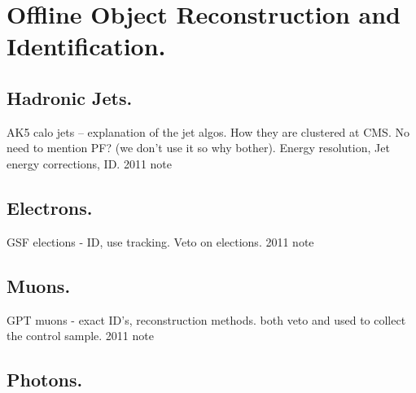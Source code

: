 \chapter{Offline Object Reconstruction and Identification.} %
\label{cha:offline_object_deffinitions}
\section{Hadronic Jets.} %
\label{sec:hadronic_jets}
AK5 calo jets -- explanation of the jet algos. How they are clustered at CMS.
No need to mention PF? (we don't use it so why bother). Energy resolution, Jet 
energy corrections, ID. 2011 note



\section{Electrons.} %
\label{sec:electrons}
GSF elections - ID, use tracking. Veto on elections. 2011 note

\section{Muons.} %
\label{sec:muons}
GPT muons - exact ID's, reconstruction methods. both veto and used to collect 
the control sample. 2011 note

\section{Photons.} %
\label{sec:photons}




